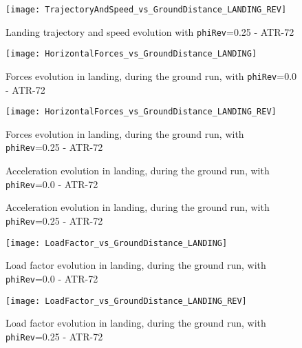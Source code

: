 %
\begin{figure}[!b]
\centering
\texttt{[image: TrajectoryAndSpeed\_vs\_GroundDistance\_LANDING\_REV]}
\caption{Landing trajectory and speed evolution with \lstinline[language=Java]!phiRev!=0.25 - ATR-72}
\end{figure}
%
\begin{figure}[!t]
\centering
\texttt{[image: HorizontalForces\_vs\_GroundDistance\_LANDING]}
\caption{Forces evolution in landing, during the ground run, with \lstinline[language=Java]!phiRev!=0.0 - ATR-72}
\end{figure}
%
\begin{figure}[!b]
\centering
\texttt{[image: HorizontalForces\_vs\_GroundDistance\_LANDING\_REV]}
\caption{Forces evolution in landing, during the ground run, with \lstinline[language=Java]!phiRev!=0.25 - ATR-72}
\end{figure}
%
\begin{figure}[!t]
\centering

\caption{Acceleration evolution in landing, during the ground run, with \lstinline[language=Java]!phiRev!=0.0 - ATR-72}
\end{figure}
%
\begin{figure}[!b]
\centering

\caption{Acceleration evolution in landing, during the ground run, with \lstinline[language=Java]!phiRev!=0.25 - ATR-72}
\end{figure}
%
\begin{figure}[!b]
\centering
\texttt{[image: LoadFactor\_vs\_GroundDistance\_LANDING]}
\caption{Load factor evolution in landing, during the ground run, with \lstinline[language=Java]!phiRev!=0.0 - ATR-72}
\end{figure}
%
\begin{figure}[!b]
\centering
\texttt{[image: LoadFactor\_vs\_GroundDistance\_LANDING\_REV]}
\caption{Load factor evolution in landing, during the ground run, with \lstinline[language=Java]!phiRev!=0.25 - ATR-72}
\label{fig:LandingEnd}
\end{figure}
%